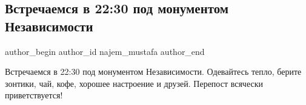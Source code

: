  
 
 
 
 
 
\subsection{Встречаемся в 22:30 под монументом Независимости}
\label{sec:21_11_2013.fb.najem_mustafa.1.vstrecha_monument_nezavisimosti}
 
\ifcmt
 author_begin
   author_id najem_mustafa
 author_end
\fi

Встречаемся в 22:30 под монументом Независимости. Одевайтесь тепло, берите
зонтики, чай, кофе, хорошее настроение и друзей. Перепост всячески
приветствуется!
